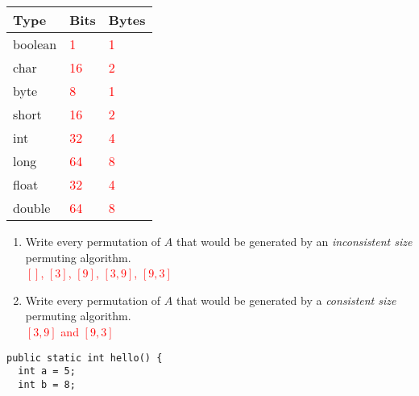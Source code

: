\documentclass[11pt,addpoints]{exam}
\begin{document}
\begin{questions}
\begin{table}[H]
\centering
\begin{tabular}{|l|l|l|}
  \hline
  Type & Bits & Bytes \\ \hline
  boolean & \textcolor{red}{1} & \textcolor{red}{1} \\ \hline
  char & \textcolor{red}{16} & \textcolor{red}{2} \\ \hline
  byte & \textcolor{red}{8} & \textcolor{red}{1} \\ \hline
  short & \textcolor{red}{16} & \textcolor{red}{2} \\ \hline
  int & \textcolor{red}{32} & \textcolor{red}{4} \\ \hline
  long & \textcolor{red}{64} & \textcolor{red}{8} \\ \hline
  float & \textcolor{red}{32} & \textcolor{red}{4} \\ \hline
  double & \textcolor{red}{64} & \textcolor{red}{8} \\ \hline
\end{tabular}
\end{table}



\begin{enumerate}[label=(\Alph*)]
  \item Write every permutation of $A$ that would be generated by an \textit{inconsistent size} permuting algorithm. \\

  \textcolor{red}{$[]$, $[3]$, $[9]$, $[3, 9]$, $[9, 3]$}


  \item Write every permutation of $A$ that would be generated by a \textit{consistent size} permuting algorithm. \\
   
  \textcolor{red}{$[3,9]$ and $[9,3]$}

\end{enumerate}

\begin{minipage}{\textwidth}

\begin{verbatim}
public static int hello() {
  int a = 5;
  int b = 8;


\end{verbatim}
\end{minipage}
\end{questions}
\end{document}
